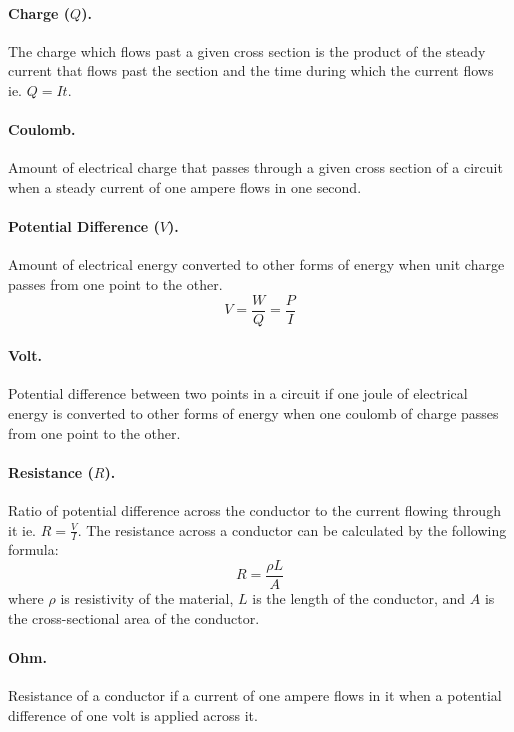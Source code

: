 \documentclass{article}
\begin{document}
\paragraph{Charge ($Q$).} The charge which flows past a given cross section is
the product of the steady current that flows past the section and the time
during which the current flows ie. $Q = It$.

\paragraph{Coulomb.} Amount of electrical charge that passes through a given
cross section of a circuit when a steady current of one ampere flows in one
second.

\paragraph{Potential Difference ($V$).} Amount of electrical energy converted to
other forms of energy when unit charge passes from one point to the other.
\begin{equation} V = \frac{W}{Q} = \frac{P}{I} \end{equation}

\paragraph{Volt.} Potential difference between two points in a circuit if one
joule of electrical energy is converted to other forms of energy when one
coulomb of charge passes from one point to the other.

\paragraph{Resistance ($R$).} Ratio of potential difference across the conductor
to the current flowing through it ie. $R = \frac{V}{I}$. The resistance across a
conductor can be calculated by the following formula: \begin{equation} R =
  \frac{\rho L}{A} \end{equation} where $\rho$ is resistivity of the material,
  $L$ is the length of the conductor, and $A$ is the cross-sectional area of the
  conductor.

\paragraph{Ohm.} Resistance of a conductor if a current of one ampere flows in
it when a potential difference of one volt is applied across it.
\end{document}
